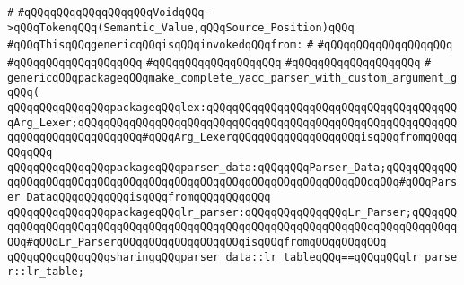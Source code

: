 \verb|#|\newline
\verb|#qQQqqQQqqQQqqQQqqQQqVoidqQQq->qQQqTokenqQQq(Semantic_Value,qQQqSource_Position)qQQq|\newline
\newline
\verb|#qQQqThisqQQqgenericqQQqisqQQqinvokedqQQqfrom:|\newline
\verb|#|\newline
\verb|#qQQqqQQqqQQqqQQqqQQq|\newline
\verb|#qQQqqQQqqQQqqQQqqQQq|\newline
\verb|#qQQqqQQqqQQqqQQqqQQq|\newline
\verb|#qQQqqQQqqQQqqQQqqQQq|\newline
\verb|#|\newline
\verb|genericqQQqpackageqQQqmake_complete_yacc_parser_with_custom_argument_gqQQq(|\newline
\newline
\verb|qQQqqQQqqQQqqQQqpackageqQQqlex:qQQqqQQqqQQqqQQqqQQqqQQqqQQqqQQqqQQqqQQqArg_Lexer;qQQqqQQqqQQqqQQqqQQqqQQqqQQqqQQqqQQqqQQqqQQqqQQqqQQqqQQqqQQqqQQqqQQqqQQqqQQqqQQq#qQQqArg_LexerqQQqqQQqqQQqqQQqqQQqisqQQqfromqQQqqQQqqQQq|\newline
\verb|qQQqqQQqqQQqqQQqpackageqQQqparser_data:qQQqqQQqParser_Data;qQQqqQQqqQQqqQQqqQQqqQQqqQQqqQQqqQQqqQQqqQQqqQQqqQQqqQQqqQQqqQQqqQQqqQQq#qQQqParser_DataqQQqqQQqqQQqisqQQqfromqQQqqQQqqQQq|\newline
\verb|qQQqqQQqqQQqqQQqpackageqQQqlr_parser:qQQqqQQqqQQqqQQqLr_Parser;qQQqqQQqqQQqqQQqqQQqqQQqqQQqqQQqqQQqqQQqqQQqqQQqqQQqqQQqqQQqqQQqqQQqqQQqqQQqqQQq#qQQqLr_ParserqQQqqQQqqQQqqQQqqQQqisqQQqfromqQQqqQQqqQQq|\newline
\newline
\verb|qQQqqQQqqQQqqQQqsharingqQQqparser_data::lr_tableqQQq==qQQqqQQqlr_parser::lr_table;|\newline
